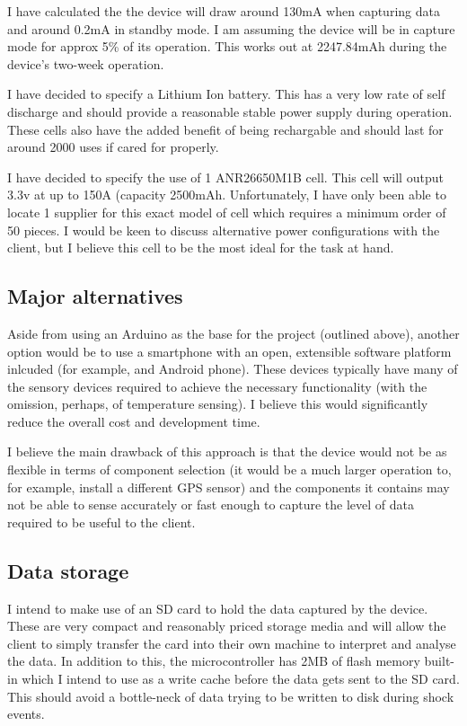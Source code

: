 \documentclass[a4paper, twoside]{article}
\begin{document}
I have calculated the the device will draw around 130mA when capturing data and
around 0.2mA in standby mode. I am assuming the device will be in capture mode
for approx 5\% of its operation. This works out at 2247.84mAh during the
device's two-week operation.

I have decided to specify a Lithium Ion battery. This has a very low rate of
self discharge and should provide a reasonable stable power supply during
operation. These cells also have the added benefit of being rechargable and
should last for around 2000 uses if cared for properly.

I have decided to specify the use of 1 ANR26650M1B cell. This cell will output
3.3v at up to 150A (capacity 2500mAh. Unfortunately, I have only been able to
locate 1 supplier for this exact model of cell which requires a minimum order of
50 pieces. I would be keen to discuss alternative power configurations with the
client, but I believe this cell to be the most ideal for the task at hand.

\subsection{Major alternatives}
Aside from using an Arduino as the base for the project (outlined above),
another option would be to use a smartphone with an open, extensible software
platform inlcuded (for example, and Android phone). These devices typically have
many of the sensory devices required to achieve the necessary functionality
(with the omission, perhaps, of temperature sensing). I believe this would
significantly reduce the overall cost and development time.

I believe the main drawback of this approach is that the device would not be as
flexible in terms of component selection (it would be a much larger operation
to, for example, install a different GPS sensor) and the components it contains
may not be able to sense accurately or fast enough to capture the level of data
required to be useful to the client.

\subsection{Data storage}
I intend to make use of an SD card to hold the data captured by the device.
These are very compact and reasonably priced storage media and will allow the
client to simply transfer the card into their own machine to interpret and
analyse the data. In addition to this, the microcontroller has 2MB of flash
memory built-in which I intend to use as a write cache before the data gets sent
to the SD card. This should avoid a bottle-neck of data trying to be written to
disk during shock events.
\end{document}
